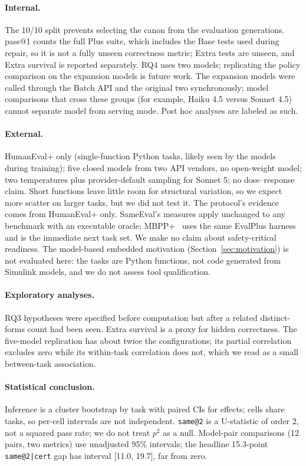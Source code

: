 \documentclass[acmsmall,screen,review,anonymous]{acmart}
\makeatletter
\newcommand{\sameeval}{SameEval}
\newcommand{\sameat}{\mbox{\texttt{same@2}}}
\newcommand{\sameatc}{\mbox{\texttt{same@2|cert}}}
\makeatother
\begin{document}
\paragraph{Internal.}
The 10/10 split prevents selecting the canon from the evaluation generations.
pass@1 counts the full Plus suite, which includes the Base tests used during
repair, so it is not a fully unseen correctness metric;
Extra tests are unseen, and Extra survival is reported separately.
RQ4 uses two models; replicating the policy comparison on the expansion models
is future work.
The expansion models were called through the Batch API and the original two synchronously; model comparisons that cross these groups (for example, Haiku 4.5 versus Sonnet 4.5) cannot separate model from serving mode.
Post hoc analyses are labeled as such.

\paragraph{External.}
HumanEval+ only (single-function Python tasks, likely seen by the models during training);
five closed models from two API vendors, no open-weight model; two
temperatures plus provider-default sampling for Sonnet 5; no dose--response
claim.
Short functions leave little room for structural variation, so we expect more
scatter on larger tasks, but we did not test it.
The protocol's evidence comes from HumanEval+ only.
\sameeval{}'s measures apply unchanged to any benchmark with an executable
oracle; MBPP+~\cite{liu2023evalplus} uses the same EvalPlus harness and is the
immediate next task set.
We make no claim about safety-critical readiness.
The model-based embedded motivation (Section~\ref{sec:motivation}) is not
evaluated here: the tasks are Python functions, not code generated from
Simulink models, and we do not assess tool qualification.

\paragraph{Exploratory analyses.}
RQ3 hypotheses were specified before computation but after a related
distinct-forms count had been seen.
Extra survival is a proxy for hidden correctness.
The five-model replication has about twice the configurations; its partial
correlation excludes zero while its within-task correlation does not, which
we read as a small between-task association.

\paragraph{Statistical conclusion.}
Inference is a cluster bootstrap by task with paired CIs for effects; cells
share tasks, so per-cell intervals are not independent.
\sameat{} is a U-statistic of order 2, not a squared pass rate; we do not treat
$p^2$ as a null.
Model-pair comparisons (12 pairs, two metrics) use unadjusted 95\% intervals; the headline 15.3-point \sameatc{} gap has interval [11.0, 19.7], far from zero.
\end{document}
